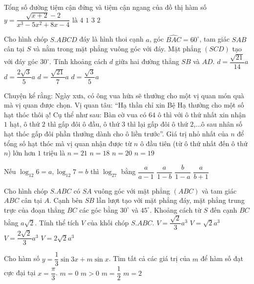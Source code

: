 \begin{ex}%
Tổng số đường tiệm cận đứng và tiệm cận ngang của đồ thị hàm số $y=\dfrac{\sqrt{x+2}-2}{x^3-5x^2+8x-4}$ là
\choice
{$4$}
{$1$}
{\True $3$}
{$2$}
\end{ex}
\begin{ex}%
Cho hình chóp $S.ABCD$ đáy là hình thoi cạnh $a$, góc $\widehat{BAC}=60^\circ$, tam giác $SAB$ cân tại $S$ và nằm trong mặt phẳng vuông góc với đáy. Mặt phẳng $(SCD)$ tạo với đáy góc $30^\circ$. Tính khoảng cách $d$ giữa hai đường thẳng $SB$ và $AD$.
\choice
{$d=\dfrac{\sqrt{21}}{14}a$}
{$d=\dfrac{2\sqrt{3}}{5}a$}
{$d=\dfrac{\sqrt{21}}{7}a$}
{\True $d=\dfrac{\sqrt{3}}{5}a$}
\end{ex}
\begin{ex}%
Chuyện kể rằng: Ngày xưa, có ông vua hứa sẽ thưởng cho một vị quan món quà mà vị quan được chọn. Vị quan tâu: ``Hạ thần chỉ xin Bệ Hạ thưởng cho một số hạt thóc thôi ạ! Cụ thể như sau: Bàn cờ vua có $64$ ô thì với ô thứ nhất xin nhận $1$ hạt, ô thứ $2$ thì gấp đôi ô đầu, ô thứ $3$ thì lại gấp đôi ô thứ $2$,...ô sau nhân số hạt thóc gấp đôi phần thưởng dành cho ô liền trước''. Giá trị nhỏ nhất của $n$ để tổng số hạt thóc mà vị quan nhận được từ $n$ ô đầu tiên (từ ô thứ nhất đến ô thứ $n$) lớn hơn $1$ triệu là
\choice
{$n=21$}
{$n=18$}
{\True $n=20$}
{$n=19$}
\end{ex}
\begin{ex}%
Nếu $\log_{12}6=a,\log_{12}7=b$ thì $\log_27$ bằng
\choice
{$\dfrac{a}{a-1}$}
{$\dfrac{a}{1-b}$}
{\True $\dfrac{b}{1-a}$}
{$\dfrac{a}{b+1}$}
\end{ex}
\begin{ex}%
Cho hình chóp $S.ABC$ có $SA$ vuông góc với mặt phẳng $(ABC)$ và tam giác $ABC$ cân tại $A$. Cạnh bên $SB$ lần lượt tạo với mặt phẳng đáy, mặt phẳng trung trực của đoạn thẳng $BC$ các góc bằng $30^\circ$ và $45^\circ$. Khoảng cách từ $S$ đến cạnh $BC$ bằng $a\sqrt{2}$. Tính thể tích $V$ của khối chóp $S.ABC$.
\choice
{\True $V=\dfrac{\sqrt{2}}{3}a^3$}
{$V=\sqrt{2}a^3$}
{$V=\dfrac{2\sqrt{2}}{3}a^3$}
{$V=2\sqrt{2}a^3$}
\end{ex}
\begin{ex}%
Cho hàm số $y=\dfrac{1}{3}\sin 3x+m\sin x$. Tìm tất cả các giá trị của $m$ để hàm số đạt cực đại tại $x=\dfrac{\pi}{3}$.
\choice
{$m=0$}
{$m>0$}
{$m=\dfrac{1}{2}$}
{\True $m=2$}
\end{ex}
